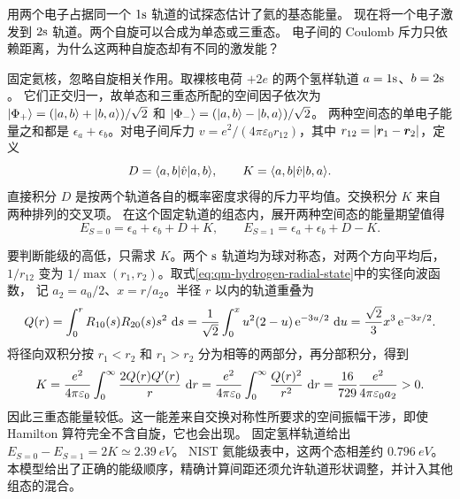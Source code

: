 用两个电子占据同一个 $1\mathrm{s}$ 轨道的试探态估计了氦的基态能量。
现在将一个电子激发到 $2\mathrm{s}$ 轨道。两个自旋可以合成为单态或三重态。
电子间的 Coulomb 斥力只依赖距离，为什么这两种自旋态却有不同的激发能？

固定氦核，忽略自旋相关作用。取裸核电荷 $+2e$ 的两个氢样轨道 $a = 1\mathrm{s}$、$b = 2\mathrm{s}$。
它们正交归一，故单态和三重态所配的空间因子依次为
$\lvert\Phi_+\rangle = (\lvert a,b\rangle + \lvert b,a\rangle)/\sqrt2$ 和 $\lvert\Phi_-\rangle = (\lvert a,b\rangle - \lvert b,a\rangle)/\sqrt2$。
两种空间态的单电子能量之和都是 $\epsilon_a + \epsilon_b$。对电子间斥力
$v = e^2/(4\pi\varepsilon_0 r_{12})$，其中 $r_{12} = \lvert\bm r_1 - \bm r_2\rvert$，定义
\begin{equation}\label{eq:qm-direct-exchange-integrals}
    D = \langle a,b\vert\hat{v}\vert a,b\rangle,\qquad K = \langle a,b\vert\hat{v}\vert b,a\rangle.
\end{equation}
直接积分 $D$ 是按两个轨道各自的概率密度求得的斥力平均值。交换积分 $K$ 来自两种排列的交叉项。
在这个固定轨道的组态内，展开两种空间态的能量期望值得
\begin{equation}
    E_{S=0} = \epsilon_a + \epsilon_b + D + K,\qquad
    E_{S=1} = \epsilon_a + \epsilon_b + D - K .
    \label{eq:qm-helium-splitting}
\end{equation}

要判断能级的高低，只需求 $K$。两个 $\mathrm{s}$ 轨道均为球对称态，对两个方向平均后，
$1/r_{12}$ 变为 $1/\max(r_1,r_2)$。取式\eqref{eq:qm-hydrogen-radial-state}中的实径向波函数，
记 $a_2 = a_0/2$、$x = r/a_2$。半径 $r$ 以内的轨道重叠为
\[
    Q(r) = \int_0^r R_{10}(s)R_{20}(s)s^2\,\mathop{}\!\mathrm{d} s
        = \frac{1}{\sqrt2}\int_0^x u^2(2 - u)\mathop{}\!\mathrm{e}^{-3u/2}\,\mathop{}\!\mathrm{d} u
        = \frac{\sqrt2}{3}x^3\mathop{}\!\mathrm{e}^{-3x/2}.
\]
将径向双积分按 $r_1 < r_2$ 和 $r_1 > r_2$ 分为相等的两部分，再分部积分，得到
\[
    K = \frac{e^2}{4\pi\varepsilon_0}\int_0^\infty\frac{2Q(r)Q'(r)}{r}\,\mathop{}\!\mathrm{d} r
     = \frac{e^2}{4\pi\varepsilon_0}\int_0^\infty\frac{Q(r)^2}{r^2}\,\mathop{}\!\mathrm{d} r
     = \frac{16}{729}\frac{e^2}{4\pi\varepsilon_0 a_2} > 0 .
\]
因此三重态能量较低。这一能差来自交换对称性所要求的空间振幅干涉，即使 Hamilton 算符完全不含自旋，它也会出现。
固定氢样轨道给出 $E_{S=0} - E_{S=1} = 2K \simeq \qty{2.39}{eV}$。
NIST 氦能级表中，这两个态相差约 $\qty{0.796}{eV}$\cite{nisthelium}。
本模型给出了正确的能级顺序，精确计算间距还须允许轨道形状调整，并计入其他组态的混合。


